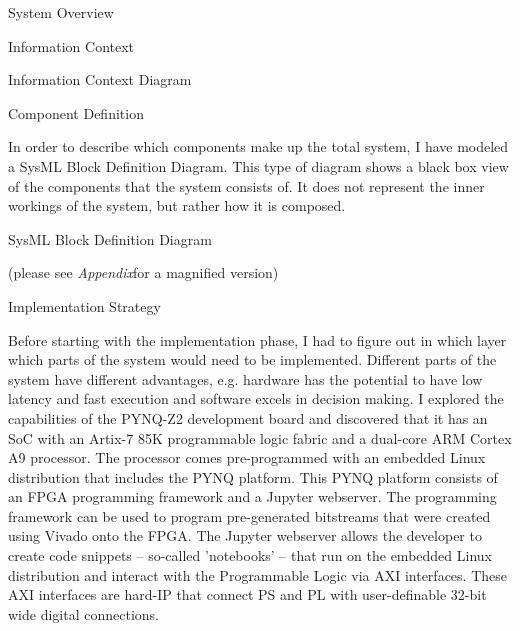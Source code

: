 \documentclass{matthijs}
\begin{document}
\begin{hoofdstuk}{System Overview}
\begin{paragraaf}{Information Context}
			\vspace{-1.2ex}
			\begin{figuur}{Information Context Diagram}
				\singlespacing
				\onehalfspacing
			\end{figuur}
			\vspace{-2ex}

		\end{paragraaf}

		\begin{paragraaf}{Component Definition}

			In order to describe which components make up the total system, I have modeled a SysML Block Definition Diagram.
			This type of diagram shows a black box view of the components that the system consists of.
			It does not represent the inner workings of the system, but rather how it is composed.

			\vspace{-1.3ex}
			\begin{figuur}{SysML Block Definition Diagram}
				\singlespacing
				\centerline{
				}
				\vspace{1.5ex}
				(please see \textit{Appendix}for a magnified version)
				\onehalfspacing
			\end{figuur}

		\end{paragraaf}

		\begin{paragraaf}{Implementation Strategy}

			Before starting with the implementation phase, I had to figure out in which layer which parts of the system would need to be implemented.
			Different parts of the system have different advantages, e.g. hardware has the potential to have low latency and fast execution and software excels in decision making.
			I explored the capabilities of the PYNQ-Z2 development board and discovered that it has an SoC with an Artix-7 85K programmable logic fabric and a dual-core ARM Cortex A9 processor.
			The processor comes pre-programmed with an embedded Linux distribution that includes the PYNQ platform.
			This PYNQ platform consists of an FPGA programming framework and a Jupyter webserver.
			The programming framework can be used to program pre-generated bitstreams that were created using Vivado onto the FPGA.
			The Jupyter webserver allows the developer to create code snippets -- so-called 'notebooks' -- that run on the embedded Linux distribution and interact with the Programmable Logic via AXI interfaces.
			These AXI interfaces are hard-IP that connect PS and PL with user-definable 32-bit wide digital connections.
		

\end{paragraaf}
\end{hoofdstuk}
\end{document}
